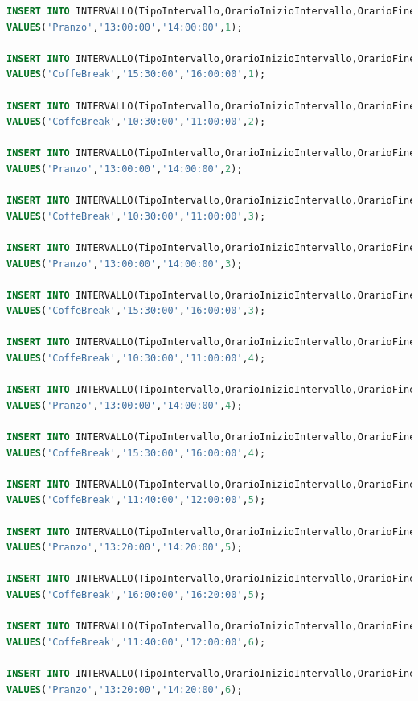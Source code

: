 \documentclass[a4page]{article}
\begin{document}
\begin{lstlisting}[language=SQL,
        deletekeywords={IDENTITY,INT},
        morekeywords={clustered},    
        framesep=10pt,
        framextopmargin=10pt]
INSERT INTO INTERVALLO(TipoIntervallo,OrarioInizioIntervallo,OrarioFineIntervallo,CodProgramma)
VALUES('Pranzo','13:00:00','14:00:00',1);

INSERT INTO INTERVALLO(TipoIntervallo,OrarioInizioIntervallo,OrarioFineIntervallo,CodProgramma)
VALUES('CoffeBreak','15:30:00','16:00:00',1);

INSERT INTO INTERVALLO(TipoIntervallo,OrarioInizioIntervallo,OrarioFineIntervallo,CodProgramma)
VALUES('CoffeBreak','10:30:00','11:00:00',2);

INSERT INTO INTERVALLO(TipoIntervallo,OrarioInizioIntervallo,OrarioFineIntervallo,CodProgramma)
VALUES('Pranzo','13:00:00','14:00:00',2);

INSERT INTO INTERVALLO(TipoIntervallo,OrarioInizioIntervallo,OrarioFineIntervallo,CodProgramma)
VALUES('CoffeBreak','10:30:00','11:00:00',3);

INSERT INTO INTERVALLO(TipoIntervallo,OrarioInizioIntervallo,OrarioFineIntervallo,CodProgramma)
VALUES('Pranzo','13:00:00','14:00:00',3);

INSERT INTO INTERVALLO(TipoIntervallo,OrarioInizioIntervallo,OrarioFineIntervallo,CodProgramma)
VALUES('CoffeBreak','15:30:00','16:00:00',3);

INSERT INTO INTERVALLO(TipoIntervallo,OrarioInizioIntervallo,OrarioFineIntervallo,CodProgramma)
VALUES('CoffeBreak','10:30:00','11:00:00',4);

INSERT INTO INTERVALLO(TipoIntervallo,OrarioInizioIntervallo,OrarioFineIntervallo,CodProgramma)
VALUES('Pranzo','13:00:00','14:00:00',4);

INSERT INTO INTERVALLO(TipoIntervallo,OrarioInizioIntervallo,OrarioFineIntervallo,CodProgramma)
VALUES('CoffeBreak','15:30:00','16:00:00',4);

INSERT INTO INTERVALLO(TipoIntervallo,OrarioInizioIntervallo,OrarioFineIntervallo,CodProgramma)
VALUES('CoffeBreak','11:40:00','12:00:00',5);

INSERT INTO INTERVALLO(TipoIntervallo,OrarioInizioIntervallo,OrarioFineIntervallo,CodProgramma)
VALUES('Pranzo','13:20:00','14:20:00',5);

INSERT INTO INTERVALLO(TipoIntervallo,OrarioInizioIntervallo,OrarioFineIntervallo,CodProgramma)
VALUES('CoffeBreak','16:00:00','16:20:00',5);

INSERT INTO INTERVALLO(TipoIntervallo,OrarioInizioIntervallo,OrarioFineIntervallo,CodProgramma)
VALUES('CoffeBreak','11:40:00','12:00:00',6);

INSERT INTO INTERVALLO(TipoIntervallo,OrarioInizioIntervallo,OrarioFineIntervallo,CodProgramma)
VALUES('Pranzo','13:20:00','14:20:00',6);


\end{lstlisting}
\end{document}
